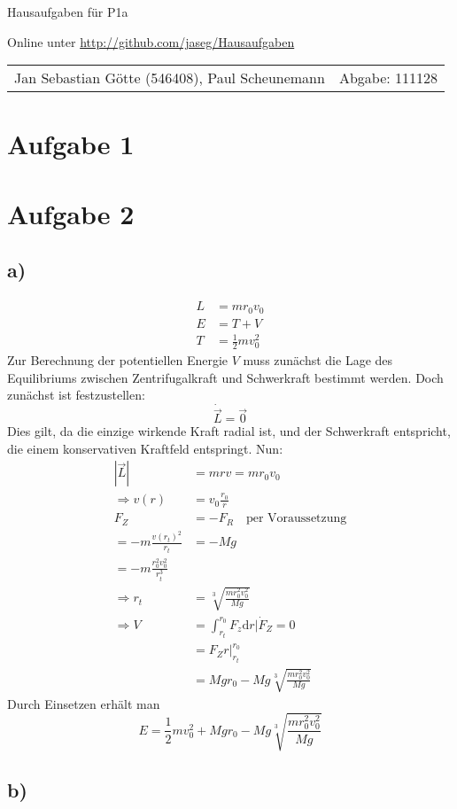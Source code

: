 \documentclass[12pt,a4paper,notitlepage]{article}
\newcommand{\diff}{\mathrm{d}}
\newcommand{\aufgabe}[1]{\section*{\setcounter{section}{#1}Aufgabe #1}}
\begin{document}
\begin{center}
\Large Hausaufgaben für P1a

\normalsize Online unter \url{http://github.com/jaseg/Hausaufgaben}
\end{center}
\begin{tabularx}{\textwidth}{Xr}
Jan Sebastian Götte (546408), Paul Scheunemann&Abgabe: 111128
\end{tabularx}
\aufgabe{1}
\aufgabe{2}
\subsection*{a)}
\begin{align}
L&=mr_0v_0\\
E&=T+V\\
T&=\frac{1}{2}mv_0^2
\end{align}
Zur Berechnung der potentiellen Energie $V$ muss zunächst die Lage des Equilibriums zwischen Zentrifugalkraft und Schwerkraft bestimmt werden. Doch zunächst ist festzustellen:
\begin{equation}
\dot{\vec L}=\vec 0
\end{equation}
Dies gilt, da die einzige wirkende Kraft radial ist, und der Schwerkraft entspricht, die einem konservativen Kraftfeld entspringt. Nun:
\begin{align}
\left|\vec L\right|&=mrv=mr_0v_0\\
\Rightarrow v(r)&=v_0\frac{r_0}{r}\\
F_Z&=-F_R\quad\text{per Voraussetzung}\\
=-m\frac{v(r_t)^2}{r_t}&=-Mg\\
=-m\frac{r_0^2v_0^2}{r_t^3}\\
\Rightarrow r_t&=\sqrt[3]{\frac{mr_0^2v_0^2}{Mg}}\\
\Rightarrow V&=\int_{r_t}^{r_0}F_z\diff r\Big|\dot F_Z=0\\
&=F_Zr\Big|_{r_t}^{r_0}\\
&=Mgr_0-Mg\sqrt[3]{\frac{mr_0^2v_0^2}{Mg}}
\end{align}
Durch Einsetzen erhält man
\begin{equation}
E=\frac{1}{2}mv_0^2+Mgr_0-Mg\sqrt[3]{\frac{mr_0^2v_0^2}{Mg}}
\end{equation}
\subsection*{b)}
\end{document}
